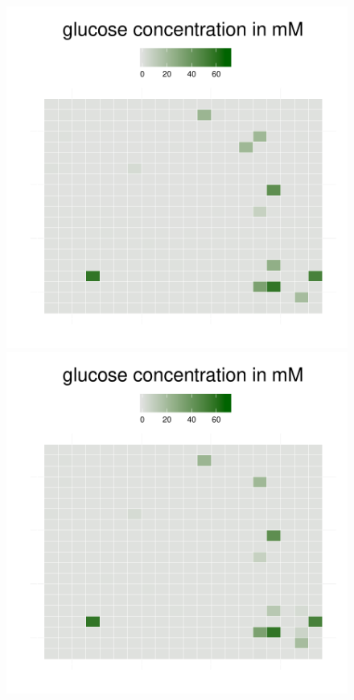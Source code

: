 \begin{figure}[h!]
{\begin{minipage}[t]{0.3\textwidth}
  \end{minipage}
  \begin{minipage}[t]{0.3\textwidth}
    \includegraphics[width=\textwidth]{../results/barkeri_beijerinckii_20x20_seed6764_glc100.pdf}
  \end{minipage}
  \begin{minipage}[t]{0.3\textwidth}
    \includegraphics[width=\textwidth]{../results/barkeri_beijerinckii_20x20_seed6764_glc150.pdf}

\end{minipage}}
\end{figure}
